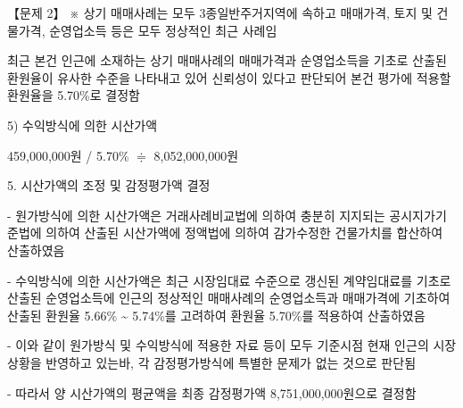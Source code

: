 \begin{longquestion}{【문제 2】}
\hspace*{0.5em}※ 상기 매매사례는 모두 3종일반주거지역에 속하고 매매가격, 토지 및 건물가격, 순영업소득 등은 모두 정상적인 최근 사례임 \par
\hspace*{0.5em}최근 본건 인근에 소재하는 상기 매매사례의 매매가격과 순영업소득을 기초로 산출된 환원율이 유사한 수준을 나타내고 있어 신뢰성이 있다고 판단되어 본건 평가에 적용할 환원율을 5.70\%로 결정함 \par
\hspace*{0.5em}5) 수익방식에 의한 시산가액 \par
\hspace*{1em}459,000,000원 / 5.70\% $\doteqdot$ 8,052,000,000원 \par
5. 시산가액의 조정 및 감정평가액 결정 \par
\hspace*{0.5em}- 원가방식에 의한 시산가액은 거래사례비교법에 의하여 충분히 지지되는 공시지가기준법에 의하여 산출된 시산가액에 정액법에 의하여 감가수정한 건물가치를 합산하여 산출하였음 \par
\hspace*{0.5em}- 수익방식에 의한 시산가액은 최근 시장임대료 수준으로 갱신된 계약임대료를 기초로 산출된 순영업소득에 인근의 정상적인 매매사례의 순영업소득과 매매가격에 기초하여 산출된 환원율 5.66\% \textasciitilde{} 5.74\%를 고려하여 환원율 5.70\%를 적용하여 산출하였음 \par
\hspace*{0.5em}- 이와 같이 원가방식 및 수익방식에 적용한 자료 등이 모두 기준시점 현재 인근의 시장상황을 반영하고 있는바, 각 감정평가방식에 특별한 문제가 없는 것으로 판단됨 \par
\hspace*{0.5em}- 따라서 양 시산가액의 평균액을 최종 감정평가액 8,751,000,000원으로 결정함 \par
\end{longquestion}
